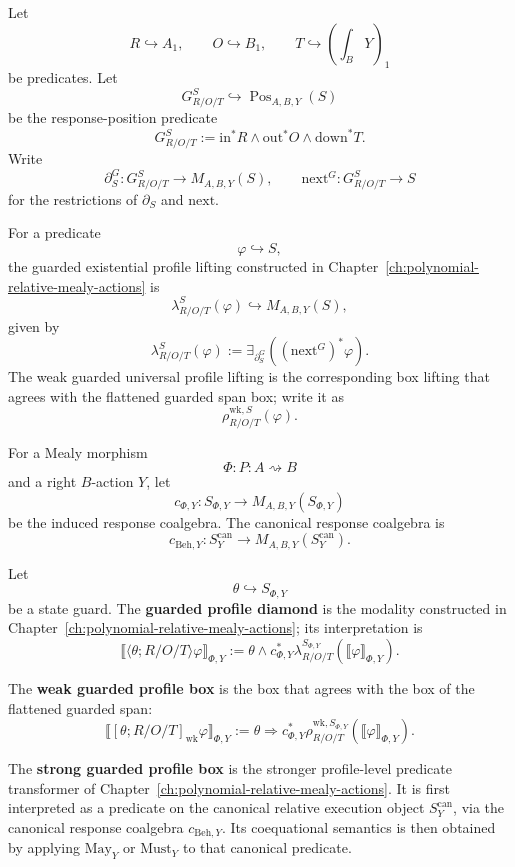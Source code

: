 Let
\[
  R\hookrightarrow A_1,
  \qquad
  O\hookrightarrow B_1,
  \qquad
  T\hookrightarrow \left(\int_B Y\right)_1
\]
be predicates.  Let
\[
  G^S_{R/O/T}\hookrightarrow \operatorname{Pos}_{A,B,Y}(S)
\]
be the response-position predicate
\[
  G^S_{R/O/T}
  :=
  \mathrm{in}^*R
  \wedge
  \mathrm{out}^*O
  \wedge
  \mathrm{down}^*T.
\]
Write
\[
  \partial^G_S:G^S_{R/O/T}\to M_{A,B,Y}(S),
  \qquad
  \mathrm{next}^G:G^S_{R/O/T}\to S
\]
for the restrictions of \(\partial_S\) and \(\mathrm{next}\).

For a predicate
\[
  \varphi\hookrightarrow S,
\]
the guarded existential profile lifting constructed in
Chapter~\ref{ch:polynomial-relative-mealy-actions} is
\[
  \lambda_{R/O/T}^S(\varphi)
  \hookrightarrow
  M_{A,B,Y}(S),
\]
given by
\[
  \lambda_{R/O/T}^S(\varphi)
  :=
  \exists_{\partial^G_S}
  \left(
    (\mathrm{next}^G)^*\varphi
  \right).
\]
The weak guarded universal profile lifting is the corresponding box lifting
that agrees with the flattened guarded span box; write it as
\[
  \rho^{\mathrm{wk},S}_{R/O/T}(\varphi).
\]

For a Mealy morphism
\[
  \Phi:P:A\rightsquigarrow B
\]
and a right \(B\)-action \(Y\), let
\[
  c_{\Phi,Y}:S_{\Phi,Y}\to M_{A,B,Y}(S_{\Phi,Y})
\]
be the induced response coalgebra.  The canonical response coalgebra is
\[
  c_{\mathrm{Beh},Y}:
  S^{\mathrm{can}}_Y
  \to
  M_{A,B,Y}(S^{\mathrm{can}}_Y).
\]

\begin{definition}
\label{def:guarded-profile-modalities}
Let
\[
  \theta\hookrightarrow S_{\Phi,Y}
\]
be a state guard.  The \textbf{guarded profile diamond} is the modality
constructed in Chapter~\ref{ch:polynomial-relative-mealy-actions}; its
interpretation is
\[
  \llbracket
    \langle\theta;R/O/T\rangle\varphi
  \rrbracket_{\Phi,Y}
  :=
  \theta
  \wedge
  c_{\Phi,Y}^*
  \lambda_{R/O/T}^{S_{\Phi,Y}}
  \left(
    \llbracket\varphi\rrbracket_{\Phi,Y}
  \right).
\]

The \textbf{weak guarded profile box} is the box that agrees with the box of
the flattened guarded span:
\[
  \llbracket
    [\theta;R/O/T]_{\mathrm{wk}}\varphi
  \rrbracket_{\Phi,Y}
  :=
  \theta
  \Rightarrow
  c_{\Phi,Y}^*
  \rho^{\mathrm{wk},S_{\Phi,Y}}_{R/O/T}
  \left(
    \llbracket\varphi\rrbracket_{\Phi,Y}
  \right).
\]

The \textbf{strong guarded profile box} is the stronger profile-level
predicate transformer of Chapter~\ref{ch:polynomial-relative-mealy-actions}.
It is first interpreted as a predicate on the canonical relative execution
object \(S^{\mathrm{can}}_Y\), via the canonical response coalgebra
\(c_{\mathrm{Beh},Y}\).  Its coequational semantics is then obtained by
applying \(\mathrm{May}_Y\) or \(\mathrm{Must}_Y\) to that canonical
predicate.
\end{definition}

